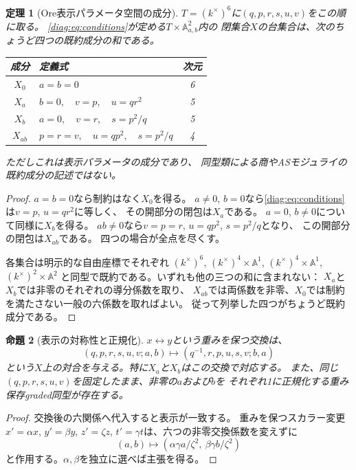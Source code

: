 \documentclass[11pt,a4paper]{ltjsarticle}
\newtheorem{theorem}{定理}[section]
\newtheorem{proposition}[theorem]{命題}
\theoremstyle{definition}
\begin{document}
\begin{theorem}[Ore表示パラメータ空間の成分]\label{diag:thm:components}
$T=(k^\times)^6$に$(q,p,r,s,u,v)$をこの順に取る。
\eqref{diag:eq:conditions}が定める$T\times\mathbb A^2_{a,b}$内の
閉集合$X$の台集合は、次の\emph{ちょうど四つ}の既約成分の和である。
\begin{center}
\begin{tabular}{c|p{.59\linewidth}|c}
\toprule
成分 & 定義式 & 次元\\
\midrule
$X_0$ & $a=b=0$ & 6\\
$X_a$ & $b=0,\quad v=p,\quad u=qr^2$ & 5\\
$X_b$ & $a=0,\quad v=r,\quad s=p^2/q$ & 5\\
$X_{ab}$ & $p=r=v,\quad u=qp^2,\quad s=p^2/q$ & 4\\
\bottomrule
\end{tabular}
\end{center}
ただしこれは\emph{表示パラメータ}の成分であり、
同型類による商やASモジュライの既約成分の記述ではない。
\end{theorem}
\begin{proof}
$a=b=0$なら制約はなく$X_0$を得る。
$a\ne0$, $b=0$なら\eqref{diag:eq:conditions}は$v=p$, $u=qr^2$に等しく、
その開部分の閉包は$X_a$である。
$a=0$, $b\ne0$について同様に$X_b$を得る。
$a b\ne0$なら$v=p=r$, $u=qp^2$, $s=p^2/q$となり、
この開部分の閉包は$X_{ab}$である。
四つの場合が全点を尽くす。

各集合は明示的な自由座標でそれぞれ
$(k^\times)^6$, $(k^\times)^4\times\mathbb A^1$,
$(k^\times)^4\times\mathbb A^1$,
$(k^\times)^2\times\mathbb A^2$
と同型で既約である。いずれも他の三つの和に含まれない：
$X_a$と$X_b$では非零のそれぞれの導分係数を取り、
$X_{ab}$では両係数を非零、$X_0$では制約を満たさない一般の六係数を取ればよい。
従って列挙した四つがちょうど既約成分である。
\end{proof}

\begin{proposition}[表示の対称性と正規化]\label{diag:prop:normalization}
$x\leftrightarrow y$という重みを保つ交換は、
\[
(q,p,r,s,u,v;a,b)\longmapsto
(q^{-1},r,p,u,s,v;b,a)
\]
という$X$上の対合を与える。特に$X_a$と$X_b$はこの交換で対応する。
また、同じ$(q,p,r,s,u,v)$を固定したまま、非零の$a$および$b$を
それぞれ1に正規化する重み保存graded同型が存在する。
\end{proposition}
\begin{proof}
交換後の六関係へ代入すると表示が一致する。
重みを保つスカラー変更$x'=\alpha x$, $y'=\beta y$,
$z'=\zeta z$, $t'=\gamma t$は、六つの非零交換係数を変えずに
\[
(a,b)\longmapsto
(\alpha\gamma a/\zeta^2,\ \beta\gamma b/\zeta^2)
\]
と作用する。$\alpha,\beta$を独立に選べば主張を得る。
\end{proof}
\end{document}
